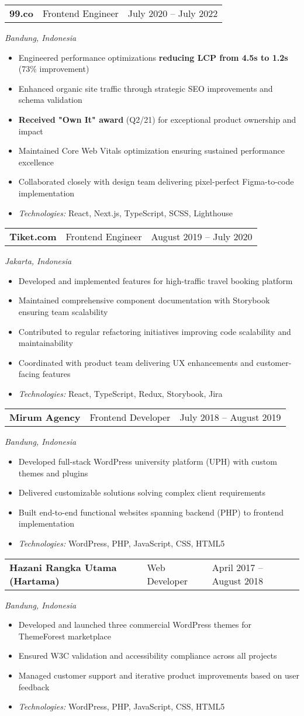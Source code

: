 \documentclass[a4paper, 11pt]{article}
\newcommand{\resumeItem}[1]{
  \item\small{
    {#1 \vspace{-2pt}}
  }
}
\newcommand{\resumeSubheading}[4]{
  \vspace{-2pt}\item
    \begin{tabularx}{0.987\textwidth}[t]{
  >{\raggedright\arraybackslash}X
  >{\centering\arraybackslash}X
  >{\raggedleft\arraybackslash}X }
      \textbf{#1} & #2 & #3 \\
    \end{tabularx}
    \textit{\small#4}\\
    \vspace{-7pt}
}
\newcommand{\resumeItemListStart}{\begin{itemize}[leftmargin=0.22in]}
\newcommand{\resumeItemListEnd}{\end{itemize}\vspace{-20pt}}
\begin{document}
      \resumeSubheading
        {99.co}{Frontend Engineer}{July 2020 -- July 2022}
        {Bandung, Indonesia}
        \resumeItemListStart
          \resumeItem{Engineered performance optimizations \textbf{reducing LCP from 4.5s to 1.2s} (73\% improvement)}
          \resumeItem{Enhanced organic site traffic through strategic SEO improvements and schema validation}
          \resumeItem{\textbf{Received "Own It" award} (Q2/21) for exceptional product ownership and impact}
          \resumeItem{Maintained Core Web Vitals optimization ensuring sustained performance excellence}
          \resumeItem{Collaborated closely with design team delivering pixel-perfect Figma-to-code implementation}
          \resumeItem{\textit{Technologies:} React, Next.js, TypeScript, SCSS, Lighthouse}
        \resumeItemListEnd

      \resumeSubheading
        {Tiket.com}{Frontend Engineer}{August 2019 -- July 2020}
        {Jakarta, Indonesia}
        \resumeItemListStart
          \resumeItem{Developed and implemented features for high-traffic travel booking platform}
          \resumeItem{Maintained comprehensive component documentation with Storybook ensuring team scalability}
          \resumeItem{Contributed to regular refactoring initiatives improving code scalability and maintainability}
          \resumeItem{Coordinated with product team delivering UX enhancements and customer-facing features}
          \resumeItem{\textit{Technologies:} React, TypeScript, Redux, Storybook, Jira}
        \resumeItemListEnd

      \resumeSubheading
        {Mirum Agency}{Frontend Developer}{July 2018 -- August 2019}
        {Bandung, Indonesia}
        \resumeItemListStart
          \resumeItem{Developed full-stack WordPress university platform (UPH) with custom themes and plugins}
          \resumeItem{Delivered customizable solutions solving complex client requirements}
          \resumeItem{Built end-to-end functional websites spanning backend (PHP) to frontend implementation}
          \resumeItem{\textit{Technologies:} WordPress, PHP, JavaScript, CSS, HTML5}
        \resumeItemListEnd

      \resumeSubheading
        {Hazani Rangka Utama (Hartama)}{Web Developer}{April 2017 -- August 2018}
        {Bandung, Indonesia}
        \resumeItemListStart
          \resumeItem{Developed and launched three commercial WordPress themes for ThemeForest marketplace}
          \resumeItem{Ensured W3C validation and accessibility compliance across all projects}
          \resumeItem{Managed customer support and iterative product improvements based on user feedback}
          \resumeItem{\textit{Technologies:} WordPress, PHP, JavaScript, CSS, HTML5}
        \resumeItemListEnd
\end{document}
